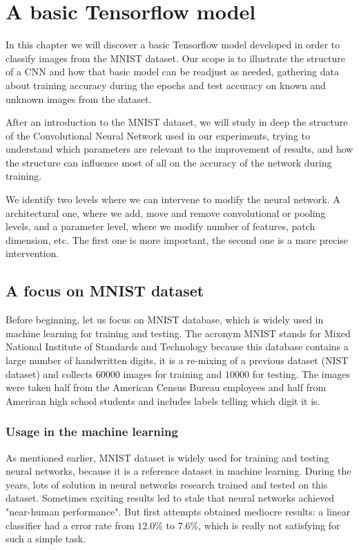 \chapter{A basic Tensorflow model}\label{ch:basic_tf_model}

In this chapter we will discover a basic Tensorflow model developed in order to classify images from the MNIST dataset. Our scope is to illustrate the structure of a \acs{CNN} and how that basic model can be readjust as needed, gathering data about training accuracy during the epochs and test accuracy on known and unknown images from the dataset.

After an introduction to the MNIST dataset, we will study in deep the structure of the Convolutional Neural Network used in our experiments, trying to understand which parameters are relevant to the improvement of results, and how the structure can influence most of all on the accuracy of the network during training.

We identify two levels where we can intervene to modify the neural network. A architectural one, where we add, move and remove convolutional or pooling levels, and a parameter level, where we modify number of features, patch dimension, etc. The first one is more important, the second one is a more precise intervention.

\section{A focus on MNIST dataset}

Before beginning, let us focus on MNIST database, which is widely used in machine learning for training and testing. The acronym MNIST stands for Mixed National Institute of Standards and Technology because this database contains a large number of handwritten digits, it is a re-mixing of a previous dataset (NIST dataset) and collects $60000$ images for training and $10000$ for testing. The images were taken half from the American Census Bureau employees and half from American high school students and includes labels telling which digit it is.

\subsection{Usage in the machine learning}

As mentioned earlier, MNIST dataset is widely used for training and testing neural networks, because it is a reference dataset in machine learning. During the years, lots of solution in neural networks research trained and tested on this dataset. Sometimes exciting results led to stale that neural networks achieved "near-human performance". But first attempts obtained mediocre results: a linear classifier had a error rate from $12.0 \%$ to $7.6 \%$, which is really not satisfying for such a simple task.

